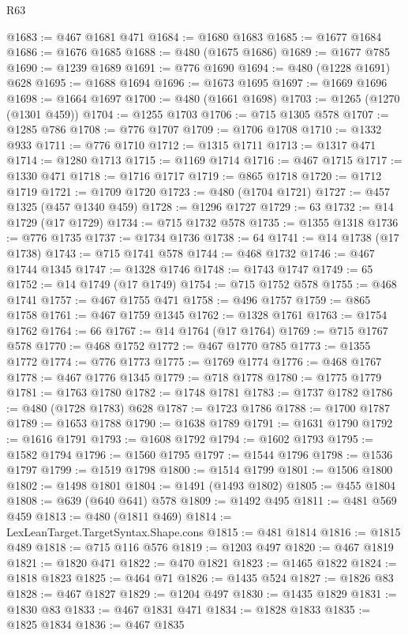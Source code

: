 \begin{lexlean}{R63}
\begin{coremodule}
@1683 := @467 @1681 @471
@1684 := @1680 @1683
@1685 := @1677 @1684
@1686 := @1676 @1685
@1688 := @480 (@1675 @1686)
@1689 := @1677 @785
@1690 := @1239 @1689
@1691 := @776 @1690
@1694 := @480 (@1228 @1691) @628
@1695 := @1688 @1694
@1696 := @1673 @1695
@1697 := @1669 @1696
@1698 := @1664 @1697
@1700 := @480 (@1661 @1698)
@1703 := @1265 (@1270 (@1301 @459))
@1704 := @1255 @1703
@1706 := @715 @1305 @578
@1707 := @1285 @786
@1708 := @776 @1707
@1709 := @1706 @1708
@1710 := @1332 @933
@1711 := @776 @1710
@1712 := @1315 @1711
@1713 := @1317 @471
@1714 := @1280 @1713
@1715 := @1169 @1714
@1716 := @467 @1715
@1717 := @1330 @471
@1718 := @1716 @1717
@1719 := @865 @1718
@1720 := @1712 @1719
@1721 := @1709 @1720
@1723 := @480 (@1704 @1721)
@1727 := @457 @1325 (@457 @1340 @459)
@1728 := @1296 @1727
@1729 := 63
@1732 := @14 @1729 (@17 @1729)
@1734 := @715 @1732 @578
@1735 := @1355 @1318
@1736 := @776 @1735
@1737 := @1734 @1736
@1738 := 64
@1741 := @14 @1738 (@17 @1738)
@1743 := @715 @1741 @578
@1744 := @468 @1732
@1746 := @467 @1744 @1345
@1747 := @1328 @1746
@1748 := @1743 @1747
@1749 := 65
@1752 := @14 @1749 (@17 @1749)
@1754 := @715 @1752 @578
@1755 := @468 @1741
@1757 := @467 @1755 @471
@1758 := @496 @1757
@1759 := @865 @1758
@1761 := @467 @1759 @1345
@1762 := @1328 @1761
@1763 := @1754 @1762
@1764 := 66
@1767 := @14 @1764 (@17 @1764)
@1769 := @715 @1767 @578
@1770 := @468 @1752
@1772 := @467 @1770 @785
@1773 := @1355 @1772
@1774 := @776 @1773
@1775 := @1769 @1774
@1776 := @468 @1767
@1778 := @467 @1776 @1345
@1779 := @718 @1778
@1780 := @1775 @1779
@1781 := @1763 @1780
@1782 := @1748 @1781
@1783 := @1737 @1782
@1786 := @480 (@1728 @1783) @628
@1787 := @1723 @1786
@1788 := @1700 @1787
@1789 := @1653 @1788
@1790 := @1638 @1789
@1791 := @1631 @1790
@1792 := @1616 @1791
@1793 := @1608 @1792
@1794 := @1602 @1793
@1795 := @1582 @1794
@1796 := @1560 @1795
@1797 := @1544 @1796
@1798 := @1536 @1797
@1799 := @1519 @1798
@1800 := @1514 @1799
@1801 := @1506 @1800
@1802 := @1498 @1801
@1804 := @1491 (@1493 @1802)
@1805 := @455 @1804
@1808 := @639 (@640 @641) @578
@1809 := @1492 @495
@1811 := @481 @569 @459
@1813 := @480 (@1811 @469)
@1814 := LexLeanTarget.TargetSyntax.Shape.cons
@1815 := @481 @1814
@1816 := @1815 @489
@1818 := @715 @116 @576
@1819 := @1203 @497
@1820 := @467 @1819
@1821 := @1820 @471
@1822 := @470 @1821
@1823 := @1465 @1822
@1824 := @1818 @1823
@1825 := @464 @71
@1826 := @1435 @524
@1827 := @1826 @83
@1828 := @467 @1827
@1829 := @1204 @497
@1830 := @1435 @1829
@1831 := @1830 @83
@1833 := @467 @1831 @471
@1834 := @1828 @1833
@1835 := @1825 @1834
@1836 := @467 @1835

\end{coremodule}
\end{lexlean}
